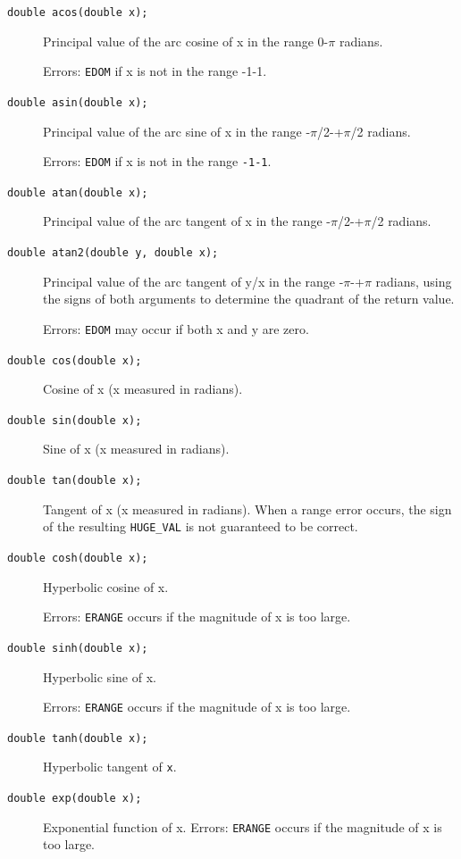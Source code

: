   
  \begin{description}
   \item[\texttt{double acos(double x);}] Principal value of the arc cosine of x in the range
    0-$\pi$ radians.

    Errors: \texttt{EDOM} if x is not in the range
    -1-1.

   \item[\texttt{double asin(double x);}] Principal value of the arc sine of x in the range
    -$\pi$/2-+$\pi$/2 radians.

    Errors: \texttt{EDOM} if x is not in the range
    \texttt{-1-1}.

   \item[\texttt{double atan(double x);}] Principal value of the arc tangent of x in the range
    -$\pi$/2-+$\pi$/2 radians.

   \item[\texttt{double atan2(double y, double x);}] Principal value of the arc tangent of y/x in the range
    -$\pi$-+$\pi$ radians, using the signs of both arguments to
    determine the quadrant of the return value.

    Errors: \texttt{EDOM} may occur if both x and y
    are zero.

   \item[\texttt{double cos(double x);}] Cosine of x (x measured in radians).

   \item[\texttt{double sin(double x);}] Sine of x (x measured in radians).

   \item[\texttt{double tan(double x);}] Tangent of x (x measured in radians).  When a
    range error occurs, the sign of the resulting \texttt{HUGE\_VAL} is not
    guaranteed to be correct.

   \item[\texttt{double cosh(double x);}] Hyperbolic cosine of x.

    Errors: \texttt{ERANGE} occurs if the magnitude of x is
    too large.

   \item[\texttt{double sinh(double x);}] Hyperbolic sine of x.

    Errors: \texttt{ERANGE} occurs if the magnitude of x is too large.

   \item[\texttt{double tanh(double x);}] Hyperbolic tangent of \texttt{x}.

   \item[\texttt{double exp(double x);}] Exponential function of x.
    Errors: \texttt{ERANGE} occurs if the magnitude of x is
    too large.


\end{description}
